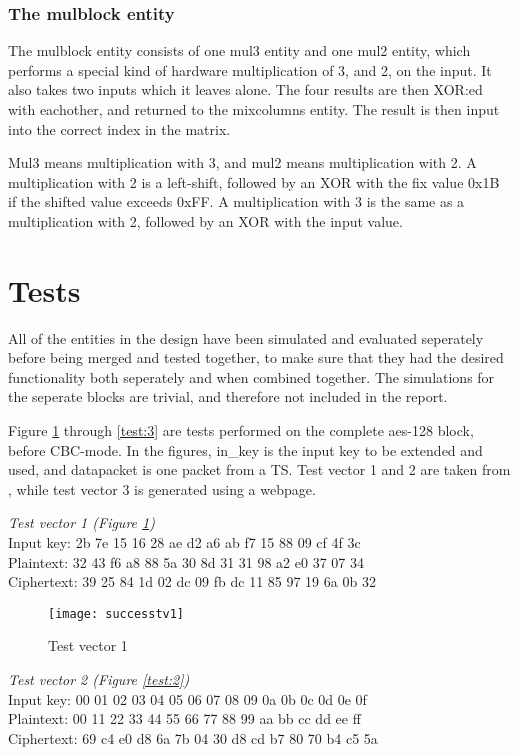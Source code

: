 \subsubsection{The mulblock entity}
The mulblock entity consists of one mul3 entity and one mul2 entity, which 
performs a special kind of hardware multiplication of 3, and 2, on the input. It 
also takes two inputs which it leaves alone. The four results are then XOR:ed 
with eachother, and returned to the mixcolumns entity. The result is then input 
into the correct index in the matrix. 

Mul3 means multiplication with 3, and mul2 means multiplication with 2. A 
multiplication with 2 is a left-shift, followed by an XOR with the fix value 0x1B
if the shifted value exceeds 0xFF. A multiplication with 3 is the same as a 
multiplication with 2, followed by an XOR with the input value.

\section{Tests}
All of the entities in the design have been simulated and evaluated seperately 
before being merged and tested together, to make sure that they had the desired 
functionality both seperately and when combined together. The simulations for the
seperate blocks are trivial, and therefore not included in the report.

Figure \ref{test:1} through \ref{test:3} are tests performed on the complete 
aes-128 block, before CBC-mode. In the figures, in\_key is the input key to be 
extended and used, and datapacket is one packet from a TS. Test vector 1 and 2 
are taken from \citep{AES:2001}, while test vector 3 is generated using a 
webpage.

\emph{Test vector 1 (Figure \ref{test:1})}\\
Input key: 2b 7e 15 16 28 ae d2 a6 ab f7 15 88 09 cf 4f 3c\\
Plaintext: 32 43 f6 a8 88 5a 30 8d 31 31 98 a2 e0 37 07 34\\
Ciphertext: 39 25 84 1d 02 dc 09 fb dc 11 85 97 19 6a 0b 32

\begin{figure}
  \texttt{[image: successtv1]}
  \caption{Test vector 1}
  \label{test:1}
\end{figure}

\emph{Test vector 2 (Figure \ref{test:2})}\\
Input key: 00 01 02 03 04 05 06 07 08 09 0a 0b 0c 0d 0e 0f\\
Plaintext: 00 11 22 33 44 55 66 77 88 99 aa bb cc dd ee ff\\
Ciphertext: 69 c4 e0 d8 6a 7b 04 30 d8 cd b7 80 70 b4 c5 5a

